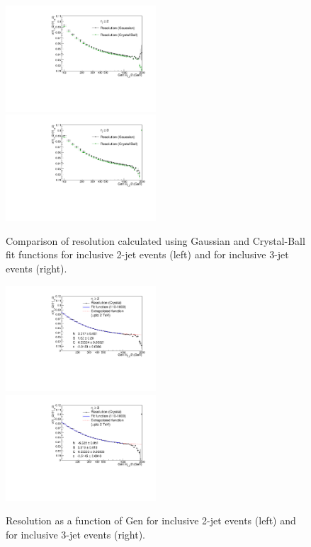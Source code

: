 \begin{figure}[!htbp]
  \begin{center}
    \includegraphics[width=0.5\textwidth]{Plots_HT_2_150/Comparison_Resolution_Crystal_Gauss_2.pdf}%
    \includegraphics[width=0.5\textwidth]{Plots_HT_2_150/Comparison_Resolution_Crystal_Gauss_3.pdf}
    \caption{Comparison of resolution calculated using Gaussian and Crystal-Ball fit functions for inclusive 2-jet events (left) and for inclusive 3-jet events (right).}
    \label{fig:res_comp}
    
   \includegraphics[width=0.5\textwidth]{Plots_HT_2_150/Extrapolate_Sigma_Value_Res_2_crystal_range.pdf}%
    \includegraphics[width=0.5\textwidth]{Plots_HT_2_150/Extrapolate_Sigma_Value_Res_3_crystal.pdf}
    \caption{Resolution as a function of Gen \httwo for inclusive 2-jet events (left) and for inclusive 3-jet events (right).}
    \label{fig:resolution}
  \end{center}
\end{figure}

